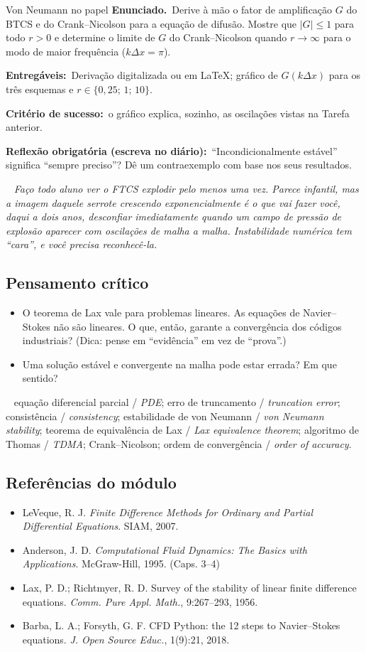 \documentclass[10pt,a4paper,twocolumn,openany]{report}
\newcommand{\lead}[2]{\par\medskip\noindent{\color{#1}\bfseries #2}\ }
\newenvironment{professor}{\lead{laranja}{Nota do professor.}\itshape}{\par\medskip}
\newenvironment{critico}{\subsection*{\textcolor{roxo}{Pensamento crítico}}}{\par}
\newenvironment{chaves}{\lead{cinza}{Palavras-chave (PT/EN):}\small}{\par}
\newenvironment{refs}{\subsection*{Referências do módulo}\small}{\par}
\newcommand{\enunciado}{\noindent\textbf{Enunciado.}\ }
\newcommand{\entregaveis}{\par\medskip\noindent\textbf{Entregáveis:}}
\newcommand{\criterio}{\par\medskip\noindent\textbf{Critério de sucesso:}\ }
\newcommand{\reflexao}{\par\medskip\noindent\textbf{Reflexão obrigatória (escreva no diário):}}
\begin{document}
\begin{tarefa}{Von Neumann no papel}
\enunciado Derive à mão o fator de amplificação $G$ do BTCS e do
Crank--Nicolson para a equação de difusão. Mostre que $|G|\le1$ para todo
$r>0$ e determine o limite de $G$ do Crank--Nicolson quando $r\rightarrow\infty$
para o modo de maior frequência ($k\Delta x=\pi$).
\entregaveis\ Derivação digitalizada ou em \LaTeX; gráfico de $G(k\Delta x)$
para os três esquemas e $r\in\{0{,}25;\,1;\,10\}$.
\criterio o gráfico explica, sozinho, as oscilações vistas na Tarefa anterior.
\reflexao\ ``Incondicionalmente estável'' significa ``sempre preciso''? Dê um
contraexemplo com base nos seus resultados.
\end{tarefa}

\begin{professor}
Faço todo aluno ver o FTCS explodir pelo menos uma vez. Parece infantil, mas
a imagem daquele serrote crescendo exponencialmente é o que vai fazer você,
daqui a dois anos, desconfiar imediatamente quando um campo de pressão de
explosão aparecer com oscilações de malha a malha. Instabilidade numérica tem
``cara'', e você precisa reconhecê-la.
\end{professor}

\begin{critico}
\begin{itemize}
  \item O teorema de Lax vale para problemas lineares. As equações de
        Navier--Stokes não são lineares. O que, então, garante a convergência
        dos códigos industriais? (Dica: pense em ``evidência'' em vez de
        ``prova''.)
  \item Uma solução estável e convergente na malha pode estar errada? Em
        que sentido?
\end{itemize}
\end{critico}

\begin{chaves}
equação diferencial parcial / \emph{PDE}; erro de truncamento /
\emph{truncation error}; consistência / \emph{consistency}; estabilidade de
von Neumann / \emph{von Neumann stability}; teorema de equivalência de Lax /
\emph{Lax equivalence theorem}; algoritmo de Thomas / \emph{TDMA};
Crank--Nicolson; ordem de convergência / \emph{order of accuracy}.
\end{chaves}

\begin{refs}
\begin{itemize}
  \item LeVeque, R. J. \emph{Finite Difference Methods for Ordinary and Partial Differential Equations}. SIAM, 2007.
  \item Anderson, J. D. \emph{Computational Fluid Dynamics: The Basics with Applications}. McGraw-Hill, 1995. (Caps. 3--4)
  \item Lax, P. D.; Richtmyer, R. D. Survey of the stability of linear finite difference equations. \emph{Comm. Pure Appl. Math.}, 9:267--293, 1956.
  \item Barba, L. A.; Forsyth, G. F. CFD Python: the 12 steps to Navier--Stokes equations. \emph{J. Open Source Educ.}, 1(9):21, 2018.
\end{itemize}
\end{refs}
\end{document}
